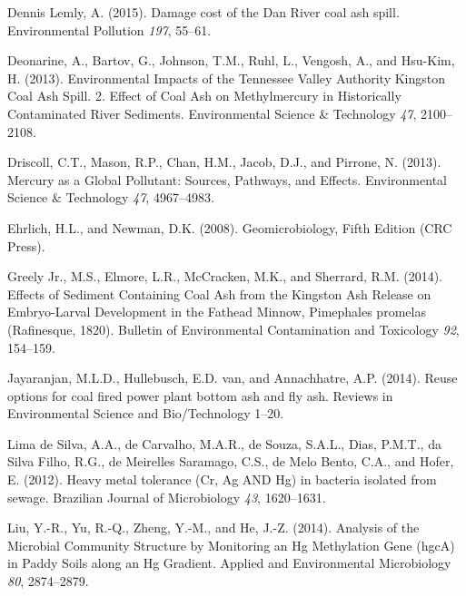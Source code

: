 \documentclass[ms]{uncgdissertationexp}
\theoremstyle{plain}
\theoremstyle{definition}
\theoremstyle{remark}
\begin{document}
  \hypertarget{ref-dennislemlyDamageCostDan2015}{}
  Dennis Lemly, A. (2015). Damage cost of the Dan River coal ash spill.
  Environmental Pollution \emph{197}, 55--61.
  
  \hypertarget{ref-deonarineEnvironmentalImpactsTennessee2013}{}
  Deonarine, A., Bartov, G., Johnson, T.M., Ruhl, L., Vengosh, A., and
  Hsu-Kim, H. (2013). Environmental Impacts of the Tennessee Valley
  Authority Kingston Coal Ash Spill. 2. Effect of Coal Ash on
  Methylmercury in Historically Contaminated River Sediments.
  Environmental Science \& Technology \emph{47}, 2100--2108.
  
  \hypertarget{ref-driscollMercuryGlobalPollutant2013}{}
  Driscoll, C.T., Mason, R.P., Chan, H.M., Jacob, D.J., and Pirrone, N.
  (2013). Mercury as a Global Pollutant: Sources, Pathways, and Effects.
  Environmental Science \& Technology \emph{47}, 4967--4983.
  
  \hypertarget{ref-ehrlichGeomicrobiologyFifthEdition2008}{}
  Ehrlich, H.L., and Newman, D.K. (2008). Geomicrobiology, Fifth Edition
  (CRC Press).
  
  \hypertarget{ref-greelyjr.EffectsSedimentContaining2014}{}
  Greely Jr., M.S., Elmore, L.R., McCracken, M.K., and Sherrard, R.M.
  (2014). Effects of Sediment Containing Coal Ash from the Kingston Ash
  Release on Embryo-Larval Development in the Fathead Minnow, Pimephales
  promelas (Rafinesque, 1820). Bulletin of Environmental Contamination and
  Toxicology \emph{92}, 154--159.
  
  \hypertarget{ref-jayaranjanReuseOptionsCoal2014}{}
  Jayaranjan, M.L.D., Hullebusch, E.D. van, and Annachhatre, A.P. (2014).
  Reuse options for coal fired power plant bottom ash and fly ash. Reviews
  in Environmental Science and Bio/Technology 1--20.
  
  \hypertarget{ref-limadesilvaHeavyMetalTolerance2012}{}
  Lima de Silva, A.A., de Carvalho, M.A.R., de Souza, S.A.L., Dias,
  P.M.T., da Silva Filho, R.G., de Meirelles Saramago, C.S., de Melo
  Bento, C.A., and Hofer, E. (2012). Heavy metal tolerance (Cr, Ag AND Hg)
  in bacteria isolated from sewage. Brazilian Journal of Microbiology
  \emph{43}, 1620--1631.
  
  \hypertarget{ref-liuAnalysisMicrobialCommunity2014}{}
  Liu, Y.-R., Yu, R.-Q., Zheng, Y.-M., and He, J.-Z. (2014). Analysis of
  the Microbial Community Structure by Monitoring an Hg Methylation Gene
  (hgcA) in Paddy Soils along an Hg Gradient. Applied and Environmental
  Microbiology \emph{80}, 2874--2879.
  
\end{document}
